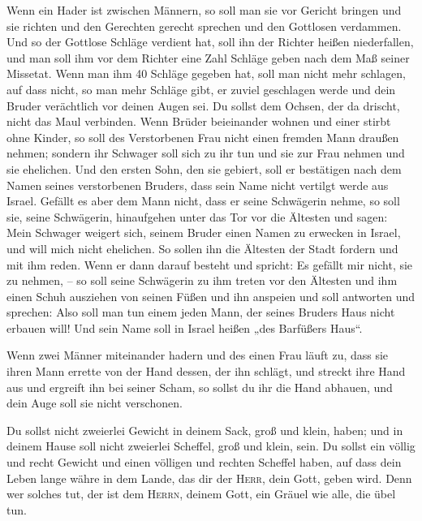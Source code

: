  Wenn ein Hader ist zwischen Männern, so soll man sie vor
Gericht bringen und sie richten und den Gerechten gerecht sprechen und
den Gottlosen verdammen.  Und so der Gottlose Schläge
verdient hat, soll ihn der Richter heißen niederfallen, und man soll ihm
vor dem Richter eine Zahl Schläge geben nach dem Maß seiner Missetat.
 Wenn man ihm 40 Schläge gegeben hat, soll man nicht mehr
schlagen, auf dass nicht, so man mehr Schläge gibt, er zuviel geschlagen
werde und dein Bruder verächtlich vor deinen Augen sei. 
Du sollst dem Ochsen, der da drischt, nicht das Maul verbinden.
 Wenn Brüder beieinander wohnen und einer stirbt ohne
Kinder, so soll des Verstorbenen Frau nicht einen fremden Mann draußen
nehmen; sondern ihr Schwager soll sich zu ihr tun und sie zur Frau
nehmen und sie ehelichen.  Und den ersten Sohn, den sie
gebiert, soll er bestätigen nach dem Namen seines verstorbenen Bruders,
dass sein Name nicht vertilgt werde aus Israel.  Gefällt
es aber dem Mann nicht, dass er seine Schwägerin nehme, so soll sie,
seine Schwägerin, hinaufgehen unter das Tor vor die Ältesten und sagen:
Mein Schwager weigert sich, seinem Bruder einen Namen zu erwecken in
Israel, und will mich nicht ehelichen.  So sollen ihn die
Ältesten der Stadt fordern und mit ihm reden. Wenn er dann darauf
besteht und spricht: Es gefällt mir nicht, sie zu nehmen, --
 so soll seine Schwägerin zu ihm treten vor den Ältesten
und ihm einen Schuh ausziehen von seinen Füßen und ihn anspeien und soll
antworten und sprechen: Also soll man tun einem jeden Mann, der seines
Bruders Haus nicht erbauen will!  Und sein Name soll in
Israel heißen „des Barfüßers Haus``.

 Wenn zwei Männer miteinander hadern und des einen Frau
läuft zu, dass sie ihren Mann errette von der Hand dessen, der ihn
schlägt, und streckt ihre Hand aus und ergreift ihn bei seiner Scham,
 so sollst du ihr die Hand abhauen, und dein Auge soll
sie nicht verschonen.

 Du sollst nicht zweierlei Gewicht in deinem Sack, groß
und klein, haben;  und in deinem Hause soll nicht
zweierlei Scheffel, groß und klein, sein.  Du sollst ein
völlig und recht Gewicht und einen völligen und rechten Scheffel haben,
auf dass dein Leben lange währe in dem Lande, das dir der \textsc{Herr},
dein Gott, geben wird.  Denn wer solches tut, der ist dem
\textsc{Herrn}, deinem Gott, ein Gräuel wie alle, die übel tun.

